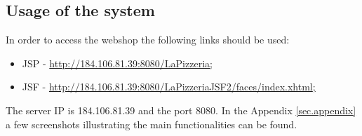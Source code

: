\subsection{Usage of the system}
\label{sec.thesystem.usage}
In order to access the webshop the following links should be used:

\begin{itemize}
  \item JSP -
  \href{http://184.106.81.39:8080/LaPizzeria}{\url{http://184.106.81.39:8080/LaPizzeria};}
  \item JSF -
  \href{http://184.106.81.39:8080/LaPizzeriaJSF2/faces/index.xhtml}{\url{http://184.106.81.39:8080/LaPizzeriaJSF2/faces/index.xhtml};}
\end{itemize}

The server IP is 184.106.81.39 and the port 8080. In the Appendix
\ref{sec.appendix} a few screenshots illustrating the main functionalities can be found.
